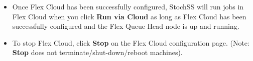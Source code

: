 \begin{itemize}
\item Once Flex Cloud has been successfully configured, StochSS will run jobs in Flex Cloud when you click \textbf{Run via Cloud} as long as Flex Cloud has been successfully configured and the Flex Queue Head node is up and running.

\item To stop Flex Cloud, click \textbf{Stop} on the Flex Cloud configuration page. (Note: \textbf{Stop} does not terminate/shut-down/reboot machines).


\end{itemize}

